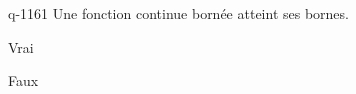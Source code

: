 \begin{truefalse}{q-1161}
Une fonction continue bornée atteint ses bornes.
\item Vrai
\item* Faux
\end{truefalse}

